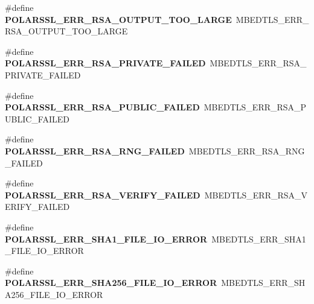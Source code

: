 \begin{DoxyCompactItemize}
\#define {\bfseries P\+O\+L\+A\+R\+S\+S\+L\+\_\+\+E\+R\+R\+\_\+\+R\+S\+A\+\_\+\+O\+U\+T\+P\+U\+T\+\_\+\+T\+O\+O\+\_\+\+L\+A\+R\+GE}~M\+B\+E\+D\+T\+L\+S\+\_\+\+E\+R\+R\+\_\+\+R\+S\+A\+\_\+\+O\+U\+T\+P\+U\+T\+\_\+\+T\+O\+O\+\_\+\+L\+A\+R\+GE
\item 
\mbox{\label{compat-1_83_8h_a44f5543dce7fc29b240a516e68acd019}} 
\#define {\bfseries P\+O\+L\+A\+R\+S\+S\+L\+\_\+\+E\+R\+R\+\_\+\+R\+S\+A\+\_\+\+P\+R\+I\+V\+A\+T\+E\+\_\+\+F\+A\+I\+L\+ED}~M\+B\+E\+D\+T\+L\+S\+\_\+\+E\+R\+R\+\_\+\+R\+S\+A\+\_\+\+P\+R\+I\+V\+A\+T\+E\+\_\+\+F\+A\+I\+L\+ED
\item 
\mbox{\label{compat-1_83_8h_a6f6e6c330a1005f0846c4d033b49558c}} 
\#define {\bfseries P\+O\+L\+A\+R\+S\+S\+L\+\_\+\+E\+R\+R\+\_\+\+R\+S\+A\+\_\+\+P\+U\+B\+L\+I\+C\+\_\+\+F\+A\+I\+L\+ED}~M\+B\+E\+D\+T\+L\+S\+\_\+\+E\+R\+R\+\_\+\+R\+S\+A\+\_\+\+P\+U\+B\+L\+I\+C\+\_\+\+F\+A\+I\+L\+ED
\item 
\mbox{\label{compat-1_83_8h_a07f72608ba6249132c9a6cf497f0371d}} 
\#define {\bfseries P\+O\+L\+A\+R\+S\+S\+L\+\_\+\+E\+R\+R\+\_\+\+R\+S\+A\+\_\+\+R\+N\+G\+\_\+\+F\+A\+I\+L\+ED}~M\+B\+E\+D\+T\+L\+S\+\_\+\+E\+R\+R\+\_\+\+R\+S\+A\+\_\+\+R\+N\+G\+\_\+\+F\+A\+I\+L\+ED
\item 
\mbox{\label{compat-1_83_8h_a6c8054af82b411547c45248cc684609b}} 
\#define {\bfseries P\+O\+L\+A\+R\+S\+S\+L\+\_\+\+E\+R\+R\+\_\+\+R\+S\+A\+\_\+\+V\+E\+R\+I\+F\+Y\+\_\+\+F\+A\+I\+L\+ED}~M\+B\+E\+D\+T\+L\+S\+\_\+\+E\+R\+R\+\_\+\+R\+S\+A\+\_\+\+V\+E\+R\+I\+F\+Y\+\_\+\+F\+A\+I\+L\+ED
\item 
\mbox{\label{compat-1_83_8h_a71eaf8aa36e347940b9132e7882b9bf4}} 
\#define {\bfseries P\+O\+L\+A\+R\+S\+S\+L\+\_\+\+E\+R\+R\+\_\+\+S\+H\+A1\+\_\+\+F\+I\+L\+E\+\_\+\+I\+O\+\_\+\+E\+R\+R\+OR}~M\+B\+E\+D\+T\+L\+S\+\_\+\+E\+R\+R\+\_\+\+S\+H\+A1\+\_\+\+F\+I\+L\+E\+\_\+\+I\+O\+\_\+\+E\+R\+R\+OR
\item 
\mbox{\label{compat-1_83_8h_a3aefddbb99ed99898d7ccd1d58301205}} 
\#define {\bfseries P\+O\+L\+A\+R\+S\+S\+L\+\_\+\+E\+R\+R\+\_\+\+S\+H\+A256\+\_\+\+F\+I\+L\+E\+\_\+\+I\+O\+\_\+\+E\+R\+R\+OR}~M\+B\+E\+D\+T\+L\+S\+\_\+\+E\+R\+R\+\_\+\+S\+H\+A256\+\_\+\+F\+I\+L\+E\+\_\+\+I\+O\+\_\+\+E\+R\+R\+OR
\item 

\end{DoxyCompactItemize}
